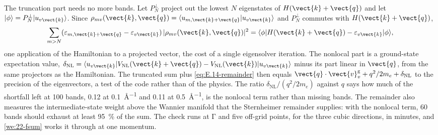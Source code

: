 The truncation part needs no more bands. Let $P^\perp_N$ project out the lowest $N$ eigenstates of $H(\vect{k}+\vect{q})$ and let $|\phi\rangle = P^\perp_N|u_{v\vect{k}}\rangle$. Since $\rho_{mv}(\vect{k},\vect{q}) = \langle u_{m,\vect{k}+\vect{q}}|u_{v\vect{k}}\rangle$ and $P^\perp_N$ commutes with $H(\vect{k}+\vect{q})$,
\begin{equation}
  \sum_{m>N}(\varepsilon_{m,\vect{k}+\vect{q}} - \varepsilon_{v\vect{k}})\,|\rho_{mv}(\vect{k},\vect{q})|^2 = \langle\phi|H(\vect{k}+\vect{q}) - \varepsilon_{v\vect{k}}|\phi\rangle ,
  \label{eq:E.14-remainder}
\end{equation}
one application of the Hamiltonian to a projected vector, the cost of a single eigensolver iteration. The nonlocal part is a ground-state expectation value, $\delta_{\mathrm{NL}} = \langle u_{v\vect{k}}|V_{\mathrm{NL}}(\vect{k}+\vect{q}) - V_{\mathrm{NL}}(\vect{k})|u_{v\vect{k}}\rangle$ minus its part linear in $\vect{q}$, from the same projectors as the Hamiltonian. The truncated sum plus \cref{eq:E.14-remainder} then equals $\vect{q}\cdot\vect{v}^{\mathrm{g}}_v + q^2/2m_e + \delta_{\mathrm{NL}}$ to the precision of the eigenvectors, a test of the code rather than of the physics. The ratio $\delta_{\mathrm{NL}}/(q^2/2m_e)$ against $q$ says how much of the shortfall left at 100 bands, 0.12 at \SI{0.1}{\angstrom^{-1}} and 0.11 at \SI{0.5}{\angstrom^{-1}}, is the nonlocal term rather than missing bands. The remainder also measures the intermediate-state weight above the Wannier manifold that the Sternheimer remainder supplies: with the nonlocal term, 60 bands should exhaust at least \SI{95}{\percent} of the sum. The check runs at $\mathrm{\Gamma}$ and five off-grid points, for the three cubic directions, in minutes, and \cref{we:22-fsum} works it through at one momentum.

